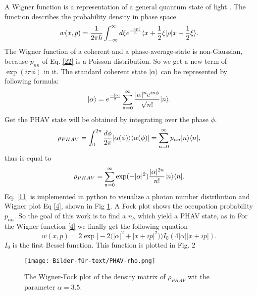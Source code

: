 \documentclass[12pt,a4paper]{article}
\DeclarePairedDelimiter\bra{\langle}{\rvert}
\DeclarePairedDelimiter\ket{\lvert}{\rangle}
\begin{document}
A Wigner function is a representation of a general quantum state of light \cite{Allevi2013}.
The function describes the probability density in phase space.
\begin{equation}
w(x,p)=\frac{1}{2\pi \hbar}\int_{- \infty}^{\infty} d\xi e^{\frac{-i p \xi}{\hbar}}\bra{x+\frac{1}{2}\xi}\rho\ket{x-\frac{1}{2}\xi}.\label{4}
\end{equation}
The Wigner function of a coherent and a phase-average-state is non-Gaussian, because $p_{nn} $ of Eq. \eqref{22}  is a  Poisson distribution. 
 So we get a new term of $\exp(i\pi\phi)$ in it. 
The standard coherent state $\ket{\alpha}$ can be represented by following formula: 
\begin{equation}
\ket{\alpha}=e^{\frac{-|\alpha|}{2}}\sum_{n=0}^{\infty}\frac{|\alpha|^n e^{in\phi}}{\sqrt{n!}} \ket{n}.
\end{equation}
Get the PHAV state will be obtained by integrating over the phase $\phi$.
\begin{equation}
\rho_{PHAV}=\int_0 ^{2\pi}\frac{d\phi}{2\pi}\ket{\alpha(\phi)}\bra{\alpha(\phi)}=\sum_{n=0}^{\infty}p_{nn}\ket{n}\bra{n},\label{22}
\end{equation}
thus is equal to
\begin{equation}
\rho_{PHAV}= \sum_{n=0}^{\infty}\exp(-|\alpha|^2)\frac{|\alpha|^{2n}}{n!} \ket{n}\bra{n}.\label{11}
\end{equation}
Eq. \eqref{11} is implemented in python to visualize a photon number distribution and Wigner plot  Eq \eqref{4}, shown in Fig \ref{21}.
A Fock plot shows the occupation probability $p_{nn}$.
So the goal of this work is to find a $n_h$ which yield a PHAV state,
as in \cite{Allevi2013} 
For the Wigner function \eqref{4} we finally get the following equation
\begin{equation}
w(x,p)=2  \exp\bigl[-2\bigl(|\alpha|^2+|x+ip|^2\bigr)\bigr) I_0 (4|\alpha| |x+ip|).
\end{equation}
$I_0$ is the first  Bessel function.
This function is plotted in Fig. 2
\begin{figure}[hbtp]
\hspace{-1.4cm}
\texttt{[image: Bilder-für-text/PHAV-rho.png]}\label{21}
\caption{The Wigner-Fock plot of the density matrix of $\rho_{PHAV}$ wit the parameter $\alpha=3.5$.}
\end{figure}



\end{document}
